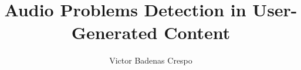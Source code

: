 \documentclass[a4paper,12pt,twoside]{report}
\begin{document}

\title{Audio Problems Detection in User-Generated Content}
\author{Victor Badenas Crespo}

\maketitle

\maketitle
\restoregeometry

\preface
\cleardoublepage 




\body







\listoffigures
\newpage
\listoftables





\end{document}
